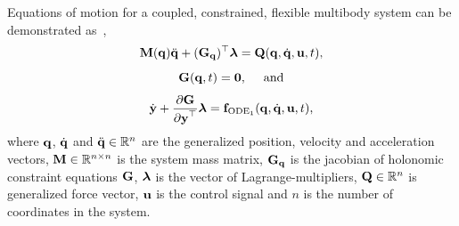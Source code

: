 Equations of motion for a coupled, constrained, flexible multibody system can be
demonstrated as~\cite{gerstmayr2023exudyn},
\begin{equation} \label{Eq01: GeneralEOM}
    {\mathbf{M}({{\mathbf{q}}})}{\ddot{\mathbf{q}}} + { ({\mathbf{G}}_{{\mathbf{q}}})^{\top} \bm{\lambda}}  = {{\mathbf{Q} ({{\mathbf{q}}}, {\dot{\mathbf{q}}}, {{\mathbf{u}}}, t)  }},
\end{equation}
\begin{equation} \label{Eq01: GeneralEOM1}
    {{\mathbf{G}} ({{\mathbf{q}}},t)} = {\mathbf{0}}, \quad~\text{and}
\end{equation}
\begin{equation} \label{Eq03: GeneralEOM1}
 \dot{\mathbf{y}} + \frac{\partial \mathbf{G}}{{\partial {\mathbf{y}} }^{\top}} \bm{\lambda} = {{\mathbf{f}_{\mathrm{ODE}_{1}}} ({{\mathbf{q}}}, {\dot{\mathbf{q}}}, {{\mathbf{u}}}, t)}, 
\end{equation}
where ${{\mathbf{q}}}$, ${\dot{\mathbf{q}}}$ and  ${\ddot{\mathbf{q}}} \in \mathbb{R}^{n}$ are the generalized position, velocity and acceleration vectors, ${\mathbf{M}} \in \mathbb{R}^{n \times n }$ is the system mass matrix, ${\mathbf{G}}_{{\mathbf{q}}}$ is the jacobian of {holonomic} constraint equations ${{\mathbf{G}}}$, $\bm{\lambda}$ is the vector of Lagrange-multipliers, ${\mathbf{Q} \in \mathbb{R}^{n}}$ is generalized force vector, ${{\mathbf{u}}}$ is the control signal  and $n$ is the number of coordinates in the system.

